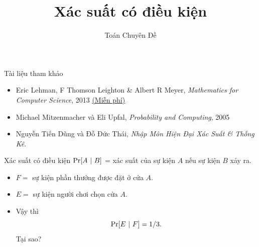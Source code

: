%


\title{Xác suất có điều kiện} 
 \author{Toán Chuyên Đề}
     
\maketitle

\begin{frame}{Tài liệu tham khảo}
  \begin{itemize}
  \item Eric Lehman, F Thomson Leighton \& Albert R Meyer,
    \textit{Mathematics for Computer Science}, 2013
    \href{https://www.seas.harvard.edu/courses/cs20/MIT6_042Notes.pdf}{\color{blue}(Miễn
    phí)}
  \item Michael Mitzenmacher và Eli Upfal, \textit{Probability and Computing}, 2005
  \item  Nguyễn Tiến Dũng và Đỗ Đức Thái, \textit{Nhập Môn Hiện Đại Xác Suất \& Thống Kê}.
  \end{itemize}
\end{frame}

\begin{frame}
  \begin{block}{Xác suất có điều kiện}
    $\pr[A\ |\  B]$ = xác suất của sự kiện $A$ nếu  sự kiện $B$ xảy ra.
  \end{block}
\begin{xmpl}
  \begin{itemize}
  \item $F =$ sự kiện phần thưởng được đặt ở cửa $A$.
  \item $E  =$ sự kiện người chơi chọn cửa $A$.
  \item Vậy thì 
    $$
    \mathrm{Pr} [E \ | \ F] = 1/3. 
    $$
Tại sao?
  \end{itemize}
\end{xmpl}
\end{frame}

